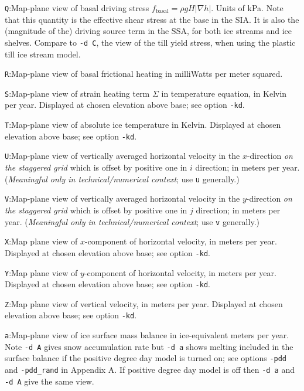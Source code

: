 \documentclass[11pt,final]{amsart}
\newcommand{\grad}{\nabla}
\begin{document}
\verb|Q|:\quad Map-plane view of basal driving stress $f_{\text{basal}} = \rho g H |\grad h|$.  Units of kPa.  Note that this quantity is the effective shear stress at the base in the SIA.  It is also the (magnitude of the) driving source term in the SSA, for both ice streams and ice shelves.  Compare to \verb|-d C|, the view of the till yield stress, when using the plastic till ice stream model.

\verb|R|:\quad Map-plane view of basal frictional heating in milliWatts per meter squared.

\verb|S|:\quad Map-plane view of strain heating term $\Sigma$ in temperature equation, in Kelvin per year.  Displayed at chosen elevation above base; see option \verb|-kd|.

\verb|T|:\quad Map-plane view of absolute ice temperature in Kelvin.  Displayed at chosen elevation above base; see option \verb|-kd|.

\verb|U|:\quad Map-plane view of vertically averaged horizontal velocity in the $x$-direction \emph{on the staggered grid} which is offset by positive one in $i$ direction;  in meters per year.  (\emph{Meaningful only in technical/numerical context}; use \verb|u| generally.)

\verb|V|:\quad Map-plane view of vertically averaged horizontal velocity in the $y$-direction \emph{on the staggered grid} which is offset by positive one in $j$ direction;  in meters per year.  (\emph{Meaningful only in technical/numerical context}; use \verb|v| generally.)

\verb|X|:\quad Map plane view of $x$-component of horizontal velocity, in meters per year.  Displayed at chosen elevation above base; see option \verb|-kd|.

\verb|Y|:\quad Map plane view of $y$-component of horizontal velocity, in meters per year.  Displayed at chosen elevation above base; see option \verb|-kd|.

\verb|Z|:\quad Map plane view of vertical velocity, in meters per year.  Displayed at chosen elevation above base; see option \verb|-kd|.

\verb|a|:\quad Map-plane view of ice surface mass balance in ice-equivalent meters per year.  Note \verb|-d A| gives snow accumulation rate but \verb|-d a| shows melting included in the surface balance if the positive degree day model is turned on; see options \verb|-pdd| and \verb|-pdd_rand| in Appendix A.  If positive degree day model is off then \verb|-d a| and \verb|-d A| give the same view.
\end{document}

